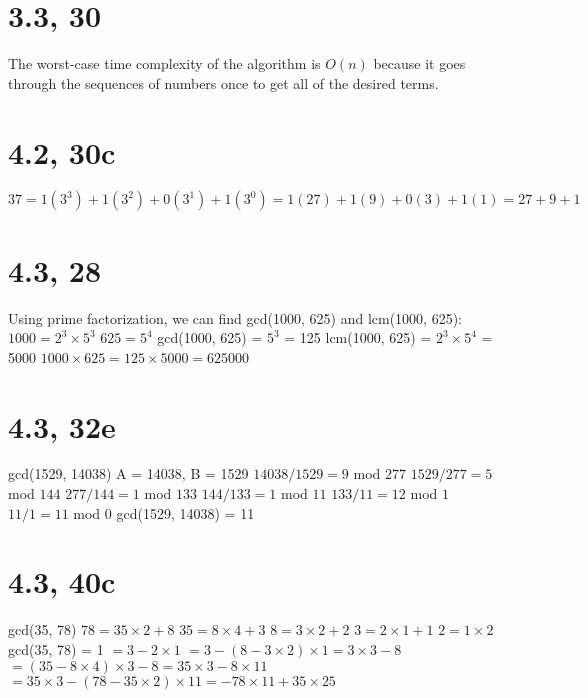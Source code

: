 \documentclass{article}
\begin{document}
\section{3.3, 30}
The worst-case time complexity of the algorithm is $O(n)$ because it goes through the sequences of numbers once to get all of the desired terms.

\section{4.2, 30c}
$37 = 1(3^3) + 1(3^2) + 0(3^1) + 1(3^0) = 1(27) + 1(9) + 0(3) + 1(1) = 27 + 9 + 1$

\section{4.3, 28}
Using prime factorization, we can find gcd(1000, 625) and lcm(1000, 625):
\newline
$1000 = 2^3 \times 5^3$
\newline
$625 = 5^4$
\newline
gcd(1000, 625) = $5^3$ = 125
\newline
lcm(1000, 625) = $2^3 \times 5^4$ = 5000
\newline
$1000 \times 625 = 125 \times 5000 = 625000$

\section{4.3, 32e}
gcd(1529, 14038)
\newline
A = 14038, B = 1529
\newline
$14038/1529 = 9$ mod $277$
\newline
$1529/277 = 5$ mod $144$
\newline
$277/144 = 1$ mod $133$
\newline
$144/133 = 1$ mod $11$
\newline
$133/11 = 12$ mod $1$
\newline
$11/1 = 11$ mod $0$
\newline
gcd(1529, 14038) = 11

\section{4.3, 40c}
gcd(35, 78)
\newline
$78 = 35 \times 2 + 8$
\newline
$35 = 8 \times 4 + 3$
\newline
$8 = 3 \times 2 + 2$
\newline
$3 = 2 \times 1 + 1$
\newline
$2 = 1 \times 2$
\newline
gcd(35, 78) = 1
\newline
$= 3 - 2 \times 1$
\newline
$= 3 - (8 - 3 \times 2) \times 1 = 3 \times 3 - 8$
\newline
$= (35 - 8 \times 4) \times 3 - 8 = 35 \times 3 - 8 \times 11$
\newline
$= 35 \times 3 - (78 - 35 \times 2) \times 11 = -78 \times 11 + 35 \times 25$
\end{document}
